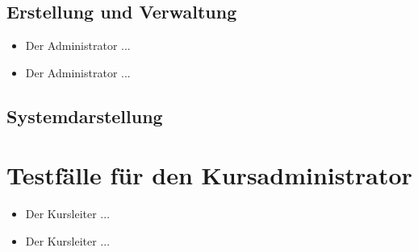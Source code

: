 \documentclass[a4paper]{scrreprt}
\newcounter{Lc}
\newcounter{Hc}
\newcommand{\stepHc}{\stepcounter{Hc}\setcounter{Lc}{0}}
\begin{document}
		\subsection{Erstellung und Verwaltung}
			\begin{itemize}
				\item {} 
				Der Administrator ... 		
				\item {} 
				Der Administrator ... 		
			\end{itemize}						
		\subsection{Systemdarstellung}
			
			
			
	\section{Testfälle für den Kursadministrator}
		\stepHc
		\begin{itemize}
			\item {} 
			Der Kursleiter ... 		
			\item {} 
			Der Kursleiter ... 		
		\end{itemize}	
		
			
\end{document}
